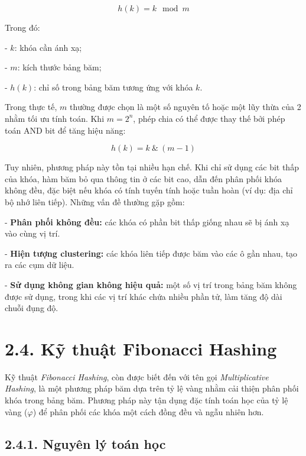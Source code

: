 \documentclass[12pt,a4paper]{report}
\begin{document}
\begin{equation}
    h(k) = k \mod m
\end{equation}

Trong đó:

    - $k$: khóa cần ánh xạ;
    
    - $m$: kích thước bảng băm;
    
    - $h(k)$: chỉ số trong bảng băm tương ứng với khóa $k$.

Trong thực tế, $m$ thường được chọn là một số nguyên tố hoặc một lũy thừa của 2 nhằm tối ưu tính toán. Khi $m = 2^n$, phép chia có thể được thay thế bởi phép toán AND bit để tăng hiệu năng:

\begin{equation}
    h(k) = k\ \&\ (m - 1)
\end{equation}

Tuy nhiên, phương pháp này tồn tại nhiều hạn chế. Khi chỉ sử dụng các bit thấp của khóa, hàm băm bỏ qua thông tin ở các bit cao, dẫn đến phân phối khóa không đều, đặc biệt nếu khóa có tính tuyến tính hoặc tuần hoàn (ví dụ: địa chỉ bộ nhớ liên tiếp). Những vấn đề thường gặp gồm:

    - \textbf{Phân phối không đều:} các khóa có phần bit thấp giống nhau sẽ bị ánh xạ vào cùng vị trí.
    
    - \textbf{Hiện tượng clustering:} các khóa liên tiếp được băm vào các ô gần nhau, tạo ra các cụm dữ liệu.
    
    - \textbf{Sử dụng không gian không hiệu quả:} một số vị trí trong bảng băm không được sử dụng, trong khi các vị trí khác chứa nhiều phần tử, làm tăng độ dài chuỗi đụng độ.

\section*{2.4. Kỹ thuật Fibonacci Hashing}
\noindent \indent Kỹ thuật \textit{Fibonacci Hashing}, còn được biết đến với tên gọi \textit{Multiplicative Hashing}, là một phương pháp băm dựa trên tỷ lệ vàng nhằm cải thiện phân phối khóa trong bảng băm. Phương pháp này tận dụng đặc tính toán học của tỷ lệ vàng ($\varphi$) để phân phối các khóa một cách đồng đều và ngẫu nhiên hơn.

\subsection*{2.4.1. Nguyên lý toán học}
\end{document}
